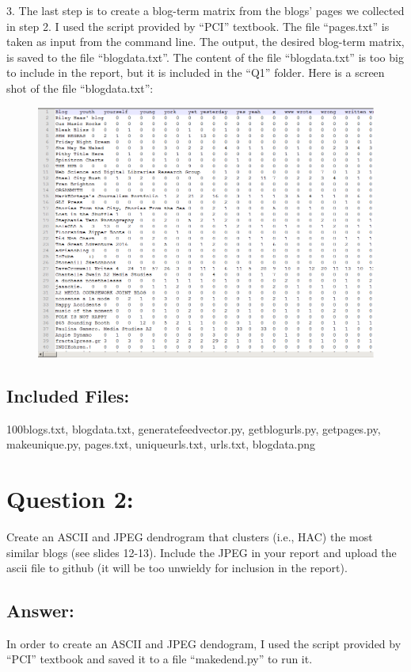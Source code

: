 \documentclass[a4paper, 11pt]{article}
\begin{document}
3. The last step is to create a blog-term matrix from the blogs' pages we collected in step 2. I used the script provided by ``PCI'' textbook. The file ``pages.txt'' is taken as input from the command line. The output, the desired blog-term matrix, is saved to the file ``blogdata.txt''. The content of the file ``blogdata.txt'' is too big to include in the report, but it is included in the ``Q1'' folder. Here is a screen shot of the file ``blogdata.txt'':

\begin{figure}[H]
\centering
\includegraphics[scale=0.5]{blogdata.png}
\end{figure}

\subsection*{Included Files:}
100blogs.txt, blogdata.txt, generatefeedvector.py, getblogurls.py, getpages.py, makeunique.py, pages.txt, uniqueurls.txt, urls.txt, blogdata.png


\section*{Question 2:}
Create an ASCII and JPEG dendrogram that clusters (i.e., HAC)
the most similar blogs (see slides 12-13).  Include the JPEG in
your report and upload the ascii file to github (it will be too
unwieldy for inclusion in the report).

\subsection*{Answer:}
In order to create an ASCII and JPEG dendogram, I used the script provided by ``PCI'' textbook and saved it to a file ``makedend.py'' to run it. 
\end{document}
